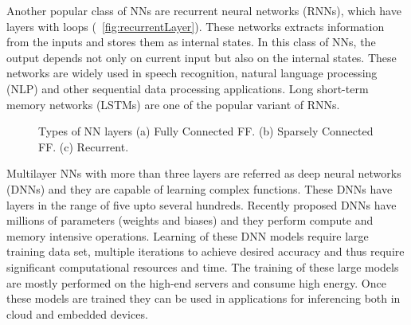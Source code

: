\documentclass[a4paper,10pt]{article}
\begin{document}
Another popular class of NNs are recurrent neural networks (RNNs), which have layers with loops (\figurename{~\ref{fig:recurrentLayer}}). These networks extracts information from the inputs and stores them as internal states. In this class of NNs, the output depends not only on current input but also on the internal states. These networks are widely used in speech recognition, natural language processing (NLP) and other sequential data processing applications. Long short-term memory networks (LSTMs) are one of the popular variant of RNNs.

\begin{figure}[!htb]
	\centering
	\hfil
	\hfil
	\caption{Types of NN layers (a) Fully Connected FF. (b) Sparsely Connected FF. (c) Recurrent. }
	\label{fig:nnLayers}
	\vspace{-1.0em}	
\end{figure}

Multilayer NNs with more than three layers are referred as deep neural networks (DNNs) and they are capable of learning complex functions. These DNNs have layers in the range of five upto several hundreds. Recently proposed DNNs have millions of parameters (weights and biases) and they perform compute and memory intensive operations. Learning of these DNN models require large training data set, multiple iterations to achieve desired accuracy and thus require significant computational resources and time. The training of these large models are mostly performed on the high-end servers and consume high energy. Once these models are trained they can be used in applications for inferencing both in cloud and embedded devices.
\end{document}
